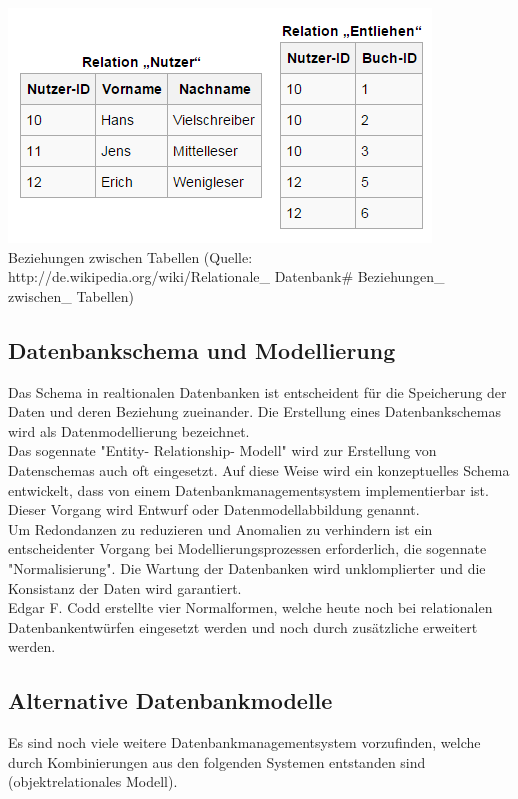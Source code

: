 \documentclass[12pt,a4paper]{report}
\begin{document}
\begin{onehalfspace}
\begin{center}
\includegraphics[scale=0.8]{img/tabellen.png}\\
Beziehungen zwischen Tabellen (Quelle: http://de.wikipedia.org/wiki/Relationale\_ Datenbank\# Beziehungen\_ zwischen\_ Tabellen)
\end{center}

\subsection{Datenbankschema und Modellierung}
Das Schema in realtionalen Datenbanken ist entscheident für die Speicherung der Daten und deren Beziehung zueinander. Die Erstellung eines Datenbankschemas wird als Datenmodellierung bezeichnet.\\

Das sogennate "{}Entity- Relationship- Modell"{} wird zur Erstellung von Datenschemas auch oft eingesetzt. Auf diese Weise wird ein konzeptuelles Schema entwickelt, dass von einem Datenbankmanagementsystem implementierbar ist. Dieser Vorgang wird Entwurf oder Datenmodellabbildung genannt.\\

Um Redondanzen zu reduzieren und Anomalien zu verhindern ist ein entscheidenter Vorgang bei Modellierungsprozessen erforderlich, die sogennate "{}Normalisierung"{}. Die Wartung der Datenbanken wird unklomplierter und die Konsistanz der Daten wird garantiert.\\

Edgar F. Codd erstellte vier Normalformen, welche heute noch bei relationalen Datenbankentwürfen eingesetzt werden und noch durch zusätzliche erweitert werden. 

\subsection{Alternative Datenbankmodelle}
Es sind noch viele weitere Datenbankmanagementsystem vorzufinden, welche durch Kombinierungen aus den folgenden Systemen entstanden sind (objektrelationales Modell). 

\end{onehalfspace}
\end{document}
